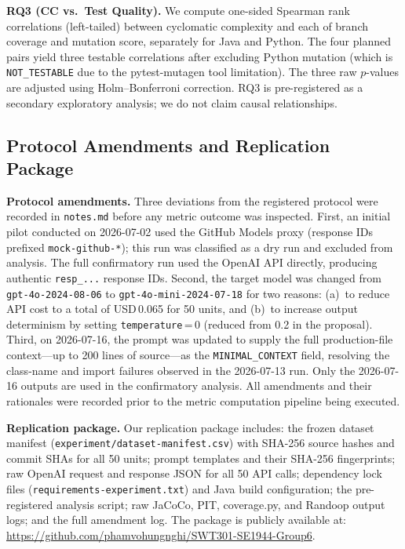 \documentclass[conference]{IEEEtran}
\begin{document}
\textbf{RQ3 (CC vs.\ Test Quality).}
We compute one-sided Spearman rank correlations (left-tailed) between cyclomatic
complexity and each of branch coverage and mutation score, separately for Java and
Python.
The four planned pairs yield three testable correlations after excluding Python
mutation (which is \texttt{NOT\_TESTABLE} due to the pytest-mutagen tool
limitation).
The three raw $p$-values are adjusted using Holm--Bonferroni correction.
RQ3 is pre-registered as a secondary exploratory analysis; we do not claim causal
relationships.

\subsection{Protocol Amendments and Replication Package}
\label{subsec:amendments}

\textbf{Protocol amendments.}
Three deviations from the registered protocol were recorded in \texttt{notes.md}
before any metric outcome was inspected.
First, an initial pilot conducted on 2026-07-02 used the GitHub Models proxy
(response IDs prefixed \texttt{mock-github-*}); this run was classified as a dry
run and excluded from analysis.
The full confirmatory run used the OpenAI API directly, producing authentic
\texttt{resp\_...} response IDs.
Second, the target model was changed from \texttt{gpt-4o-2024-08-06} to
\texttt{gpt-4o-mini-2024-07-18} for two reasons: (a)~to reduce API cost to a
total of USD\,0.065 for 50 units, and (b)~to increase output determinism by
setting \texttt{temperature}\,=\,0 (reduced from 0.2 in the proposal).
Third, on 2026-07-16, the prompt was updated to supply the full production-file
context---up to 200 lines of source---as the \texttt{MINIMAL\_CONTEXT} field,
resolving the class-name and import failures observed in the 2026-07-13 run.
Only the 2026-07-16 outputs are used in the confirmatory analysis.
All amendments and their rationales were recorded prior to the metric computation
pipeline being executed.

\textbf{Replication package.}
Our replication package includes: the frozen dataset manifest
(\texttt{experiment/dataset-manifest.csv}) with SHA-256 source hashes and
commit SHAs for all 50 units; prompt templates and their SHA-256 fingerprints;
raw OpenAI request and response JSON for all 50 API calls; dependency lock files
(\texttt{requirements-experiment.txt}) and Java build configuration; the
pre-registered analysis script; raw JaCoCo, PIT, coverage.py, and Randoop output
logs; and the full amendment log.
The package is publicly available at:
\url{https://github.com/phamvohungnghi/SWT301-SE1944-Group6}.
\end{document}
